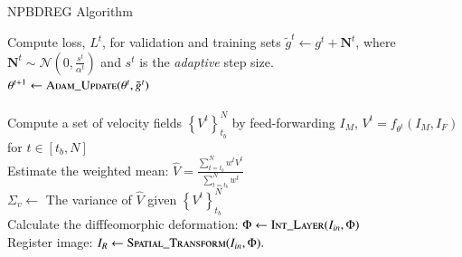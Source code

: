 \documentclass[preprint,authoryear]{elsarticle}
\begin{document}
\begin{algorithm}[ht!] 
	\SetAlgoLined
	\caption{NPBDREG Algorithm}\label{alg:1}
	{
		{   Compute loss, $L^{t}$, for validation and training sets
			$\tilde{g}^{t}\leftarrow g^{t}+\textbf{N}^{t}$, where $\textbf{N}^{t}\sim\mathcal{N}(0,\frac{s^{t}}{\alpha^t})$
			and $s^{t}$ is the \textit{adaptive} step size. \\
			$\theta^{t+1}\leftarrow \text{\textsc{Adam\_Update}}(\theta^{t},\tilde{g}^{t})$ \\
			
			
		}
		 \\
	}
	\setcounter{AlgoLine}{0}
	{
		Compute a set of velocity fields $\left\{V^{t}\right\} _{t_{b}}^{N}$ by feed-forwarding $I_M$, $V^{t}=f_{\theta^t}(I_M,I_F)$ for $t\in \left[t_b,N\right]$ \\
		Estimate the weighted mean: 
		$\hat{V}=\frac{\sum_{t=t_b}^{N}w^{t}V^t}{\sum_{t=t_b}^{N} w^{t}}$\\
		$\Sigma_v \leftarrow$ The variance of $\hat{V}$ given $\left\{ V^{t}\right\} _{t_{b}}^{N}$ \\
		Calculate the difffeomorphic deformation: $\Phi\leftarrow\text{\textsc{Int\_Layer}}(I_{in},\Phi)$ \\
		Register image: $I_{R}\leftarrow\text{\textsc{Spatial\_Transform}}(I_{in},\Phi).$ \\
		
	}
\end{algorithm}  
  
\end{document}
